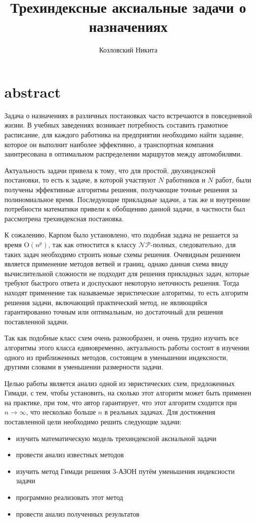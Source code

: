 \documentclass[14pt,a4paper]{article}
\author{Козловский Никита}
\title{Трехиндексные аксиальные задачи о назначениях}
\begin{document}
\section{abstract}
Задача о назначениях в различных постановках часто встречаются в повседневной
жизни. В учебных заведениях возникает потребность составить грамотное расписание,
для каждого работника на предприятии необходимо найти задание, которое он выполнит
наиболее эффективно, а транспортная компания заинтресована в оптимальном распределении
маршрутов между автомобилями.

Актуальность задачи
привела к тому, что для простой, двухиндексной постановки, то есть
к задаче, в которой участвуют $N$ работников и $N$ работ, были получены эффективные
алгоритмы решения, получающие точные решения за полиномиальное время. Последующие
прикладные задачи, а так же и внутренние потребности математики привели к
обобщению данной задачи, в частности был рассмотрена трехиндексная постановка.

К сожалению, Карпом было установлено, что подобная задача не решается за время
$\mathrm{O}(n^p)$, так как отностится к классу $\mathcal{NP}$-полных,
следовательно, для таких задач необходимо строить новые схемы
решения.
Очевидным решением является применение методов ветвей и границ, однако
данная схема ввиду вычислительной сложности не подходит для решения прикладных
задач, которые требуют быстрого ответа и доспускают некоторую неточность решения.
Тогда находят применение так называемые эвристические алгоритмы,
то есть алгоритм решения задачи, включающий практический метод, не являющийся
гарантированно точным или оптимальным, но достаточный для решения поставленной задачи.

Так как подобные класс схем очень разнообразен, и очень трудно изучить все
алгоритмы этого класса единовременно,
 актуальность работы состоит в изучении одного из приближенных методов,
 состоящем в уменьшении индексности, другими словами
 в уменьшении размерности задачи.

Целью работы является анализ одной из эвристических схем, предложенных
Гимади, с тем, чтобы установить, на сколько этот алгоритм может быть применен
на практике, при том, что автор гарантирует, что этот алгоритм сходится при
$n \rightarrow \infty $, что несколько больше $n$ в реальных задачах.
Для достижения поставленной цели необходимо решить следующие задачи:

\begin{itemize}
\item изучить математическую модель трехиндексной аксиальной задачи
\item провести анализ известных методов
\item изучить метод Гимади решения 3-АЗОН путём уменьшения индексности задачи
\item программно реализовать этот метод
\item провести анализ полученных результатов
\end{itemize}
\end{document}
